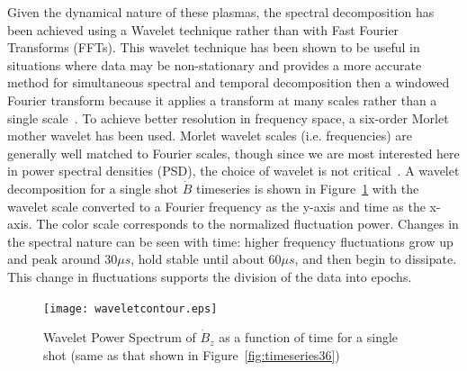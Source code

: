 \documentclass[12pt]{iopart}
\begin{document}
Given the dynamical nature of these plasmas, the spectral decomposition has been achieved using a Wavelet technique rather than with Fast Fourier Transforms (FFTs). This wavelet technique has been shown to be useful in situations where data may be non-stationary and provides a more accurate method for simultaneous spectral and temporal decomposition then a windowed Fourier transform because it applies a transform at many scales rather than a single scale~\cite{torrence98}. To achieve better resolution in frequency space, a six-order Morlet mother wavelet has been used. Morlet wavelet scales (i.e. frequencies) are generally well matched to Fourier scales, though since we are most interested here in power spectral densities (PSD), the choice of wavelet is not critical~\cite{torrence98}. A wavelet decomposition for a single shot $\dot{B}$ timeseries is shown in Figure~\ref{fig:waveletcontour} with the wavelet scale converted to a Fourier frequency as the y-axis and time as the x-axis. The color scale corresponds to the normalized fluctuation power. Changes in the spectral nature can be seen with time: higher frequency fluctuations grow up and peak around 30$\mu s$, hold stable until about 60$\mu s$, and then begin to dissipate. This change in fluctuations supports the division of the data into epochs.
\begin{figure}[!htbp]
\centerline{
\texttt{[image: waveletcontour.eps]}}
\caption{\label{fig:waveletcontour} Wavelet Power Spectrum of $\dot{B}_{z}$ as a function of time for a single shot (same as that shown in Figure~\ref{fig:timeseries36})}
\end{figure}
\end{document}
